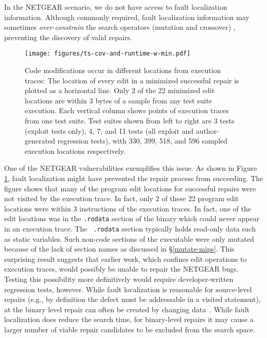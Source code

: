 \documentclass{sig-alternate}
\begin{document}
In the NETGEAR scenario, we do not have access to fault localization
information.  Although commonly required, fault localization
information may sometimes {\em over-constrain} the search operators
(mutation and crossover) \cite{schulte2013optimization}, preventing
the discovery of valid repairs.

\begin{figure}[htb]
  \centering
  \texttt{[image: figures/ts-cov-and-runtime-w-min.pdf]}
  \caption{Code modifications occur in different locations from
    execution traces: The location of every edit in a minimized
    successful repair is plotted as a horizontal line.  Only 2 of the
    22 minimized edit locations are within 3 bytes of a sample from
    any test suite execution.  Each vertical column shows points of
    execution traces from one test suite.  Test suites shown from left
    to right are 3 tests (exploit tests only), 4, 7, and 11 tests (all
    exploit and author-generated regression tests), with 330, 399,
    518, and 596 sampled execution locations respectively.}
  \label{ts-cov-rt-w-min}
\end{figure}

One of the NETGEAR vulnerabilities exemplifies this issue.  As shown
in Figure \ref{ts-cov-rt-w-min}, fault localization might have
prevented the repair process from succeeding.  The figure shows that
many of the program edit locations for successful repairs were not
visited by the execution trace.  In fact, only 2 of these 22 program
edit locations were within 3 instructions of the execution traces.  In
fact, one of the edit locations was in the {\tt .rodata} section of
the binary which could never appear in an execution trace.  The {\tt
  .rodata} section typically holds read-only data such as static
variables. Such non-code sections of the executable were only mutated
because of the lack of section names as discussed in
\S\ref{mutate-mips}.  This surprising result suggests that earlier
work, which confines edit operations to execution traces, would
possibly be unable to repair the NETGEAR bugs. Testing this
possibility more definitively would require developer-written
regression tests, however. While fault localization is reasonable for
source-level repairs (e.g., by definition the defect must be
addressable in a visited statement), at the binary level repair can
often be created by changing data~\cite{demsky06-tse,clearview}. While
fault localization does reduce the search time, for binary-level
repairs it may cause a larger number of viable repair candidates to be
excluded from the search space.
\end{document}
